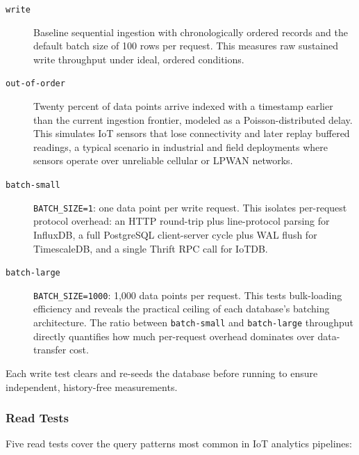 \begin{description}
  \item[\texttt{write}] Baseline sequential ingestion with chronologically ordered records and the
    default batch size of 100 rows per request. This measures raw sustained write throughput
    under ideal, ordered conditions.

  \item[\texttt{out-of-order}] Twenty percent of data points arrive indexed with a timestamp
    earlier than the current ingestion frontier, modeled as a Poisson-distributed delay. This simulates
    IoT sensors that lose connectivity and later replay buffered readings, a typical scenario
    in industrial and field deployments where sensors operate over unreliable cellular
    or LPWAN networks.

  \item[\texttt{batch-small}] \texttt{BATCH\_SIZE=1}: one data point per write request.
    This isolates per-request protocol overhead: an HTTP round-trip plus line-protocol parsing
    for InfluxDB, a full PostgreSQL client-server cycle plus WAL flush for TimescaleDB, and a
    single Thrift RPC call for IoTDB.

  \item[\texttt{batch-large}] \texttt{BATCH\_SIZE=1000}: 1{,}000 data points per request.
    This tests bulk-loading efficiency and reveals the practical ceiling of each database's
    batching architecture. The ratio between \texttt{batch-small} and \texttt{batch-large}
    throughput directly quantifies how much per-request overhead dominates over data-transfer cost.
\end{description}

Each write test clears and re-seeds the database before running to ensure independent,
history-free measurements.

\subsubsection{Read Tests}

Five read tests cover the query patterns most common in IoT analytics pipelines:

